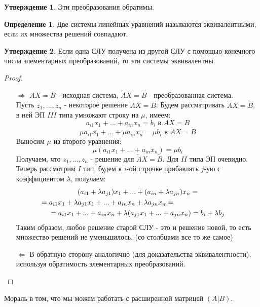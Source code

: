 \documentclass[a4paper, 12pt]{article}
\newcommand\tab[1][.5cm]{\hspace*{#1}}
\theoremstyle{definition}
\newtheorem*{definition}{Определение}
\newtheorem*{subtheorem}{Утверждение}
\begin{document}
    \begin{subtheorem}
      Эти преобразования обратимы.
    \end{subtheorem}
    \begin{definition}
      Две системы линейных уравнений называются эквивалентными, если их множества решений совпадают.
    \end{definition}
    \begin{subtheorem}
      Если одна СЛУ получена из другой СЛУ с помощью конечного числа элементарных преобразований, то эти системы эквивалентны.
    \end{subtheorem}
    \begin{proof} \tab
      \begin{itemize}
        \item[\underline{$\Longrightarrow$}]
        $AX = B$ - исходная система, $\tilde{A} X = \tilde{B}$ - преобразованная система. \\
        Пусть ${z_1,...,z_n}$ - некоторое решение $AX = B$. Будем рассматривать $\tilde{A} X = \tilde{B}$, в ней ЭП $III$ типа умножают строку на $\mu$, имеем:
        $$a_{i1}x_1 +...+ a_{in}x_n = b_{i} \text{ в } AX = B$$
        $$\mu a_{i1}x_1 +...+\mu a_{in}x_n = \mu b_i \text{ в } \tilde{A} X = \tilde{B}$$ 
        Выносим $\mu$ из второго уравнения:
        $$\mu (a_{i1}x_1 +...+ a_{in}x_n) = \mu b_i$$
        Получаем, что ${z_1,...,z_n}$ - решение для $\tilde{A} X = \tilde{B}$. Для $II$ типа ЭП очевидно. Теперь рассмотрим $I$ тип, будем к $i$-ой строчке прибавлять $j$-ую с коэффициентом $\lambda$, получаем:
        \begin{multline*}
        (a_{i1}+\lambda a_{j1})x_1 +...+(a_{in}+\lambda a_{jn})x_n = \\ = a_{i1}x_1+\lambda a_{j1}x_1 +...+a_{in}x_n+\lambda a_{jn}x_n = \tab[3cm] \\ = a_{i1}x_1 + ... + a_{in}x_n + \lambda (a_{j1}x_1 +...+ a_{jn}x_n) = b_i + \lambda b_j
        \end{multline*}
        Таким образом, любое решение старой СЛУ - это и решение новой, то есть множество
        решений не уменьшилось. (со столбцами все то же самое)
        \item[\underline{$\Longleftarrow$}]
        В обратную сторону аналогично (для доказательства эквивалентности), используя обратимость элементарных преобразований.
      \end{itemize}
    \end{proof}
    Мораль в том, что мы можем работать с расширенной матрицей $(A|B)$.
\end{document}
